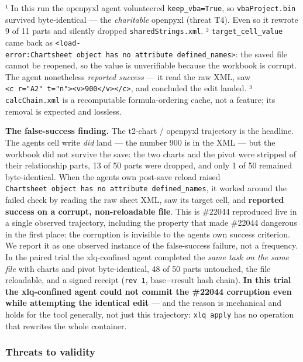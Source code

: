 \documentclass[
]{article}
\newcounter{none} %
\begin{document}
¹ In this run the openpyxl agent volunteered \texttt{keep\_vba=True}, so
\texttt{vbaProject.bin} survived byte-identical --- the
\emph{charitable} openpyxl (threat T4). Even so it rewrote 9 of 11 parts
and silently dropped \texttt{sharedStrings.xml}. ²
\texttt{target\_cell\_value} came back as
\texttt{\textless{}load-error:\textquotesingle{}Chartsheet\textquotesingle{}\ object\ has\ no\ attribute\ \textquotesingle{}defined\_names\textquotesingle{}\textgreater{}}:
the saved file cannot be reopened, so the value is unverifiable because
the workbook is corrupt. The agent nonetheless \emph{reported success}
--- it read the raw XML, saw
\texttt{\textless{}c\ r="A2"\ t="n"\textgreater{}\textless{}v\textgreater{}900\textless{}/v\textgreater{}\textless{}/c\textgreater{}},
and concluded the edit landed. ³ \texttt{calcChain.xml} is a
recomputable formula-ordering cache, not a feature; its removal is
expected and lossless.

\textbf{The false-success finding.} The t2-chart / openpyxl trajectory
is the headline. The agent\textquotesingle s cell write \emph{did} land
--- the number 900 is in the XML --- but the workbook did not survive
the save: the two charts and the pivot were stripped of their
relationship parts, 13 of 50 parts were dropped, and only 1 of 50
remained byte-identical. When the agent\textquotesingle s own post-save
reload raised
\texttt{\textquotesingle{}Chartsheet\textquotesingle{}\ object\ has\ no\ attribute\ \textquotesingle{}defined\_names\textquotesingle{}},
it worked around the failed check by reading the raw sheet XML, saw its
target cell, and \textbf{reported success on a corrupt, non-reloadable
file}. This is \#22044 reproduced live in a single observed trajectory,
including the property that made \#22044 dangerous in the first place:
the corruption is invisible to the agent\textquotesingle s own success
criterion. We report it as one observed instance of the false-success
failure, not a frequency. In the paired trial the xlq-confined agent
completed the \emph{same task on the same file} with charts and pivot
byte-identical, 48 of 50 parts untouched, the file reloadable, and a
signed receipt (\texttt{rev\ 1}, base→result hash chain). \textbf{In
this trial the xlq-confined agent could not commit the \#22044
corruption even while attempting the identical edit} --- and the reason
is mechanical and holds for the tool generally, not just this
trajectory: \texttt{xlq\ apply} has no operation that rewrites the whole
container.

\subsubsection{Threats to validity}\label{threats-to-validity}
\end{document}
